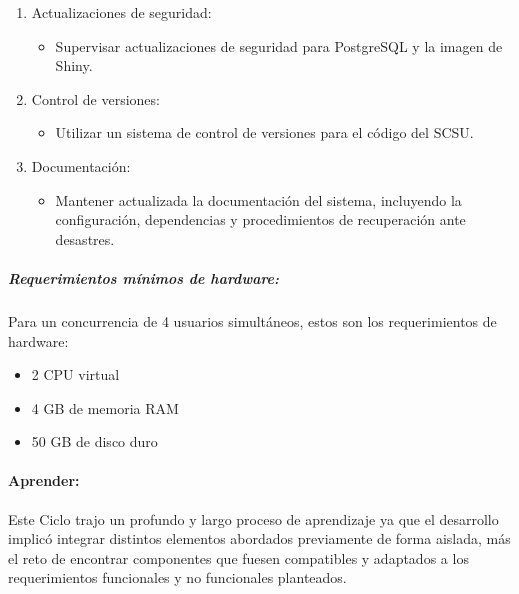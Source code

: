 \documentclass[
  12pt,
  openany]{book}
\providecommand{\tightlist}{%
  \setlength{\itemsep}{0pt}\setlength{\parskip}{0pt}}
\begin{document}
\begin{enumerate}
\def\labelenumi{\arabic{enumi}.}
\item
  Actualizaciones de seguridad:

  \begin{itemize}
  \tightlist
  \item
    Supervisar actualizaciones de seguridad para PostgreSQL y la imagen de Shiny.
  \end{itemize}
\item
  Control de versiones:

  \begin{itemize}
  \tightlist
  \item
    Utilizar un sistema de control de versiones para el código del SCSU.
  \end{itemize}
\item
  Documentación:

  \begin{itemize}
  \tightlist
  \item
    Mantener actualizada la documentación del sistema, incluyendo la configuración, dependencias y procedimientos de recuperación ante desastres.
  \end{itemize}
\end{enumerate}

\hypertarget{requerimientos-muxednimos-de-hardware}{%
\subparagraph{Requerimientos mínimos de hardware:}\label{requerimientos-muxednimos-de-hardware}}

Para un concurrencia de 4 usuarios simultáneos, estos son los requerimientos de hardware:

\begin{itemize}
\tightlist
\item
  2 CPU virtual
\item
  4 GB de memoria RAM
\item
  50 GB de disco duro
\end{itemize}

\hypertarget{implemenapre}{%
\paragraph{Aprender:}\label{implemenapre}}

Este Ciclo trajo un profundo y largo proceso de aprendizaje ya que el desarrollo implicó integrar distintos elementos abordados previamente de forma aislada, más el reto de encontrar componentes que fuesen compatibles y adaptados a los requerimientos funcionales y no funcionales planteados.
\end{document}

